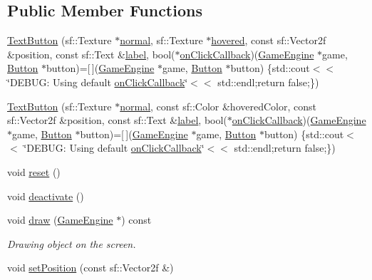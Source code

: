 \subsection*{Public Member Functions}
\begin{DoxyCompactItemize}
\item 
\mbox{\hyperlink{class_text_button_a4a48c2b297b873c7f9a667011f36a8f7}{Text\+Button}} (sf\+::\+Texture $\ast$\mbox{\hyperlink{class_button_a5a2a5e1c6b378762f5b2fe39e9053d9e}{normal}}, sf\+::\+Texture $\ast$\mbox{\hyperlink{class_button_a181477cb3462763b510a30a4f27cd756}{hovered}}, const sf\+::\+Vector2f \&position, const sf\+::\+Text \&\mbox{\hyperlink{class_text_button_af83f98d5e8997c8ddd7f47088ad6159b}{label}}, bool($\ast$\mbox{\hyperlink{class_button_a24293b3761997dd52758ee21c0058661}{on\+Click\+Callback}})(\mbox{\hyperlink{class_game_engine}{Game\+Engine}} $\ast$game, \mbox{\hyperlink{class_button}{Button}} $\ast$button)=\mbox{[}$\,$\mbox{]}(\mbox{\hyperlink{class_game_engine}{Game\+Engine}} $\ast$game, \mbox{\hyperlink{class_button}{Button}} $\ast$button) \{std\+::cout$<$$<$ \char`\"{}D\+E\+B\+U\+G\+: Using default \mbox{\hyperlink{class_button_a24293b3761997dd52758ee21c0058661}{on\+Click\+Callback}}\char`\"{}$<$$<$ std\+::endl;return false;\})
\item 
\mbox{\hyperlink{class_text_button_a24c990ee34fef994f9f70a6773b963c5}{Text\+Button}} (sf\+::\+Texture $\ast$\mbox{\hyperlink{class_button_a5a2a5e1c6b378762f5b2fe39e9053d9e}{normal}}, const sf\+::\+Color \&hovered\+Color, const sf\+::\+Vector2f \&position, const sf\+::\+Text \&\mbox{\hyperlink{class_text_button_af83f98d5e8997c8ddd7f47088ad6159b}{label}}, bool($\ast$\mbox{\hyperlink{class_button_a24293b3761997dd52758ee21c0058661}{on\+Click\+Callback}})(\mbox{\hyperlink{class_game_engine}{Game\+Engine}} $\ast$game, \mbox{\hyperlink{class_button}{Button}} $\ast$button)=\mbox{[}$\,$\mbox{]}(\mbox{\hyperlink{class_game_engine}{Game\+Engine}} $\ast$game, \mbox{\hyperlink{class_button}{Button}} $\ast$button) \{std\+::cout$<$$<$ \char`\"{}D\+E\+B\+U\+G\+: Using default \mbox{\hyperlink{class_button_a24293b3761997dd52758ee21c0058661}{on\+Click\+Callback}}\char`\"{}$<$$<$ std\+::endl;return false;\})
\item 
void \mbox{\hyperlink{class_text_button_aed840bcd62454c1233d4eadaa8b6e3b5}{reset}} ()
\item 
void \mbox{\hyperlink{class_text_button_a8b0c38245988615e9cae8795b2f177cd}{deactivate}} ()
\item 
void \mbox{\hyperlink{class_text_button_a8af6b4a6e9084f157ffb015d29a02fcf}{draw}} (\mbox{\hyperlink{class_game_engine}{Game\+Engine}} $\ast$) const
\begin{DoxyCompactList}\small\item\em Drawing object on the screen. \end{DoxyCompactList}\item 
void \mbox{\hyperlink{class_text_button_a4550c33ce65f77b9e9e119526bfcc357}{set\+Position}} (const sf\+::\+Vector2f \&)
\end{DoxyCompactItemize}

